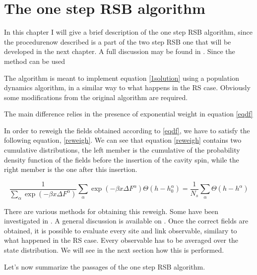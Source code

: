 \chapter{The one step RSB algorithm}

In this chapter I will give a brief description of the one step RSB algorithm, since the procedurenow  described is a part of the two step RSB one that will be developed in the next chapter. A full discussion may be found in \cite{bethe}. Since the method can be used

The algorithm is meant to implement equation \ref{1solution} using a population dynamics algorithm, in a similar way to what happens in the RS case. Obviously some modifications from the original algorithm are required.

The main difference relies in the presence of exponential weight in equation \ref{eqdf}

In order to reweigh the fields obtained according to \ref{eqdf}, we have to satisfy the following equation, \ref{reweigh}. We can see that equation \ref{reweigh} contains two cumulative distributions, the left member is the cumulative of the probability density function of the fields before the insertion of the cavity spin, while the right member is the one after this insertion.

\begin{equation}
\frac{1}{\sum_\alpha \exp(-\beta x \Delta F^{\alpha}) }\sum_\alpha \exp(-\beta x \Delta F^{\alpha}) \Theta(h-{h_{0}^{\alpha}}) = \frac{1}{N_s}\sum_\alpha \Theta(h-h^{\alpha})
\label{reweigh}
\end{equation}

There are various methods for obtaining this reweigh. Some have been investigated in \cite{bethe}. A general discussion is available on \cite{trattatello}. Once the correct fields are obtained, it is possible to evaluate every site and link observable, similary to what happened in the RS case. Every observable has to be averaged over the state distribution. We will see in the next section how this is performed.

Let's now summarize the passages of the one step RSB algorithm.

